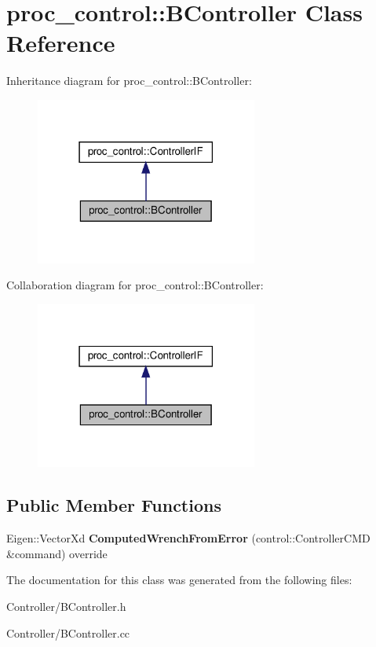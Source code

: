 \hypertarget{classproc__control_1_1_b_controller}{}\section{proc\+\_\+control\+:\+:B\+Controller Class Reference}
\label{classproc__control_1_1_b_controller}


Inheritance diagram for proc\+\_\+control\+:\+:B\+Controller\+:\nopagebreak
\begin{figure}[H]
\begin{center}
\leavevmode
\includegraphics[width=207pt]{classproc__control_1_1_b_controller__inherit__graph}
\end{center}
\end{figure}


Collaboration diagram for proc\+\_\+control\+:\+:B\+Controller\+:\nopagebreak
\begin{figure}[H]
\begin{center}
\leavevmode
\includegraphics[width=207pt]{classproc__control_1_1_b_controller__coll__graph}
\end{center}
\end{figure}
\subsection*{Public Member Functions}
\begin{DoxyCompactItemize}
\item 
\mbox{\label{classproc__control_1_1_b_controller_adb50beebef154358a61f25255cfcae0e}} 
Eigen\+::\+Vector\+Xd {\bfseries Computed\+Wrench\+From\+Error} (control\+::\+Controller\+C\+MD \&command) override
\end{DoxyCompactItemize}


The documentation for this class was generated from the following files\+:\begin{DoxyCompactItemize}
\item 
Controller/B\+Controller.\+h\item 
Controller/B\+Controller.\+cc\end{DoxyCompactItemize}
